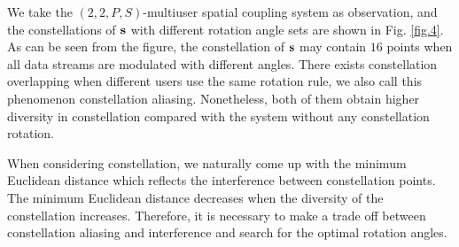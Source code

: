 \documentclass[conference]{IEEEtran}
\begin{document}
We take the $(2,2,P,S)$-multiuser spatial coupling system as observation, and the constellations of ${\bf{s}}$ with different rotation angle sets are shown in Fig. \ref{fig.4}. As can be seen from the figure, the constellation of ${\bf{s}}$ may contain $16$ points when all data streams are modulated with different angles. There exists constellation overlapping when different users use the same rotation rule, we also call this phenomenon constellation aliasing. Nonetheless, both of them obtain higher diversity in constellation compared with the system without any constellation rotation.

When considering constellation, we naturally come up with the minimum Euclidean distance which reflects the interference between constellation points. The minimum Euclidean distance decreases when the diversity of the constellation increases. Therefore, it is necessary to make a trade off between constellation aliasing and interference and search for the optimal rotation angles.
\end{document}
